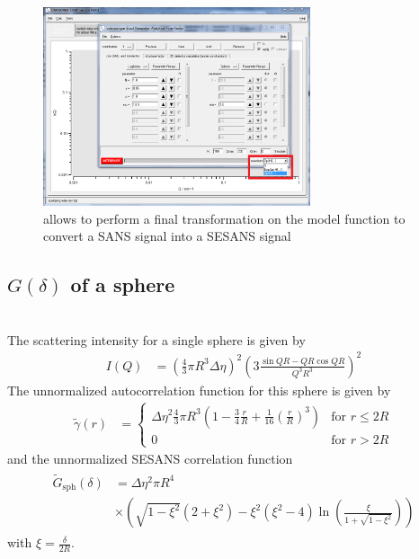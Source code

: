\begin{figure}[htb]
\begin{center}
\includegraphics[width=0.7\textwidth]{../images/GUI/HankelOperator.png}
\end{center}
\caption{\SASfit allows to perform a final transformation on the model function to convert a SANS signal into a SESANS signal}
\label{fig:HankelOp}
\end{figure}


\subsection{$G(\delta)$ of a sphere} ~\\
\label{sec:Gz_sphere}
The scattering intensity for a single sphere is given by
\begin{align}
I(Q) &= \left(\frac{4}{3}\pi R^3 \Delta\eta\right)^2 \left(3\frac{\sin QR-QR\cos QR}{Q^3R^3}\right)^2
\end{align}
The unnormalized autocorrelation function for this sphere is given by
\begin{align}
\tilde{\gamma}(r) &=
\begin{cases}
 \Delta\eta^2  \frac{4}{3}\pi R^3 \left( 1-\frac{3}{4}\frac{r}{R}+\frac{1}{16}\left(\frac{r}{R}\right)^3\right) & \mbox{for } r\leq 2R \\
0 & \mbox{for }  r>2R
\end{cases}
\end{align}
and the unnormalized SESANS correlation function
\begin{align}
\begin{split}
\tilde{G}_\mathrm{sph}(\delta)&= \Delta\eta^2 \pi R^4 \\ 
&\times \left(\sqrt{1-\xi^2}(2+\xi^2)-\xi^2(\xi^2-4)\ln\left(\frac{\xi}{1+\sqrt{1-\xi^2}}\right)\right)
\end{split}
\end{align}
with $\xi=\frac{\delta}{2R}$.


